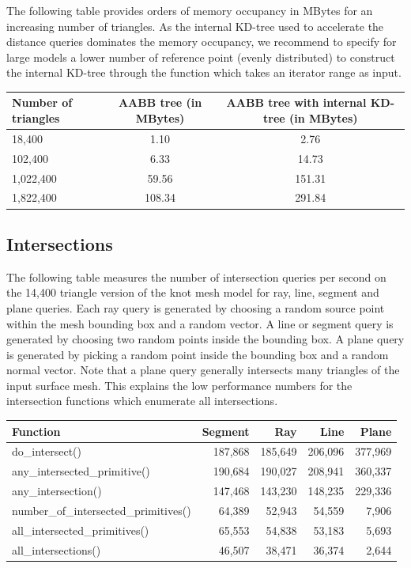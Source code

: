 The following table provides orders of memory occupancy in MBytes for an increasing number of triangles. As the internal KD-tree used to accelerate the distance queries dominates the memory occupancy, we recommend to specify for large models a lower number of reference point (evenly distributed) to construct the internal KD-tree through the function  which takes an iterator range as input.

\begin{tabular}{|l|c|c|}
  \hline
  Number of triangles & AABB tree (in MBytes) & AABB tree with internal KD-tree (in MBytes)\\
  \hline
   18,400 &   1.10 &    2.76 \\
  102,400 &   6.33 &   14.73 \\
1,022,400 &  59.56 &  151.31 \\
1,822,400 & 108.34 &  291.84 \\
  \hline
\end{tabular}



\subsection{Intersections}

The following table measures the number of intersection queries per second on the 14,400 triangle version of the knot mesh model for ray, line, segment and plane queries. Each ray query is generated by choosing a random source point within the mesh bounding box and a random vector. A line or segment query is generated by choosing two random points inside the bounding box. A plane query is generated by picking a random point inside the bounding box and a random normal vector. Note that a plane query generally intersects many triangles of the input surface mesh. This explains the low performance numbers for the intersection functions which enumerate all intersections.

\begin{tabular}{|l|r|r|r|r|}
  \hline
  Function                              & Segment &     Ray &    Line &   Plane \\
  \hline
  do\_intersect()                       & 187,868 & 185,649 & 206,096 & 377,969 \\
  any\_intersected\_primitive()         & 190,684 & 190,027 & 208,941 & 360,337 \\
  any\_intersection()                   & 147,468 & 143,230 & 148,235 & 229,336 \\
  number\_of\_intersected\_primitives() &  64,389 &  52,943 &  54,559 &   7,906 \\
  all\_intersected\_primitives()        &  65,553 &  54,838 &  53,183 &   5,693 \\
  all\_intersections()                  &  46,507 &  38,471 &  36,374 &   2,644 \\
  \hline
\end{tabular}

